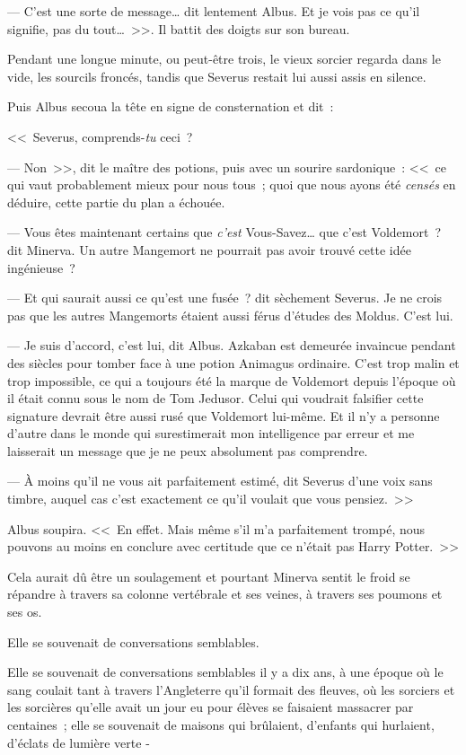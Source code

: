 --- C'est une sorte de message… dit lentement Albus. Et je vois pas ce qu'il signifie, pas du tout…~>>. Il battit des doigts sur son bureau.

Pendant une longue minute, ou peut-être trois, le vieux sorcier regarda dans le vide, les sourcils froncés, tandis que Severus restait lui aussi assis en silence.

Puis Albus secoua la tête en signe de consternation et dit~:

<<~Severus, comprends-\emph{tu} ceci~?

--- Non~>>, dit le maître des potions, puis avec un sourire sardonique~: <<~ce qui vaut probablement mieux pour nous tous~; quoi que nous ayons été \emph{censés} en déduire, cette partie du plan a échouée.

--- Vous êtes maintenant certains que \emph{c'est} Vous-Savez… que c'est Voldemort~? dit Minerva. Un autre Mangemort ne pourrait pas avoir trouvé cette idée ingénieuse~?

--- Et qui saurait aussi ce qu'est une fusée~? dit sèchement Severus. Je ne crois pas que les autres Mangemorts étaient aussi férus d'études des Moldus. C'est lui.

--- Je suis d'accord, c'est lui, dit Albus. Azkaban est demeurée invaincue pendant des siècles pour tomber face à une potion Animagus ordinaire. C'est trop malin et trop impossible, ce qui a toujours été la marque de Voldemort depuis l'époque où il était connu sous le nom de Tom Jedusor. Celui qui voudrait falsifier cette signature devrait être aussi rusé que Voldemort lui-même. Et il n'y a personne d'autre dans le monde qui surestimerait mon intelligence par erreur et me laisserait un message que je ne peux absolument pas comprendre.

--- À moins qu'il ne vous ait parfaitement estimé, dit Severus d'une voix sans timbre, auquel cas c'est exactement ce qu'il voulait que vous pensiez.~>>

Albus soupira. <<~En effet. Mais même s'il m'a parfaitement trompé, nous pouvons au moins en conclure avec certitude que ce n'était pas Harry Potter.~>>

Cela aurait dû être un soulagement et pourtant Minerva sentit le froid se répandre à travers sa colonne vertébrale et ses veines, à travers ses poumons et ses os.

Elle se souvenait de conversations semblables.

Elle se souvenait de conversations semblables il y a dix ans, à une époque où le sang coulait tant à travers l'Angleterre qu'il formait des fleuves, où les sorciers et les sorcières qu'elle avait un jour eu pour élèves se faisaient massacrer par centaines~; elle se souvenait de maisons qui brûlaient, d'enfants qui hurlaient, d'éclats de lumière verte -

